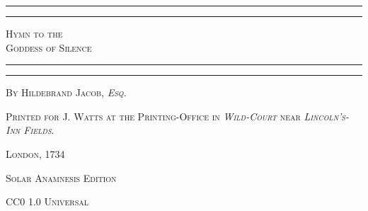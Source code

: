 \documentclass[a4paper, 11pt, oneside]{article}
\begin{document}
\begin{titlepage} %
	\centering %

	
	\rule{\textwidth}{1.6pt}\vspace*{-\baselineskip}\vspace*{2pt} %
	\rule{\textwidth}{0.4pt} %
	
	{\scshape\LARGE Hymn to the \\ Goddess of Silence}
	
	\rule{\textwidth}{0.4pt}\vspace*{-\baselineskip}\vspace{3.2pt} %
	\rule{\textwidth}{1.6pt} %

	
	\vspace{1\baselineskip}
	
	{\scshape By \Large Hildebrand Jacob, \emph{Esq.}} %
	





	
	


\vspace*{\fill}

	\vspace{1\baselineskip}

	{\footnotesize\scshape Printed for J. Watts at the Printing-Office in \emph{Wild-Court} near \emph{Lincoln's-Inn Fields}.}
	
	{\small\scshape{London, 1734}}
	
	\vspace{0.5\baselineskip} %



\scshape Solar Anamnesis Edition
	
	{\scshape\small CC0 1.0 Universal} %
\end{titlepage}
\setlength{\parskip}{1mm plus1mm minus1mm}
\setcounter{tocdepth}{3}
\setcounter{secnumdepth}{3}
\clearpage
\large
\end{document}
